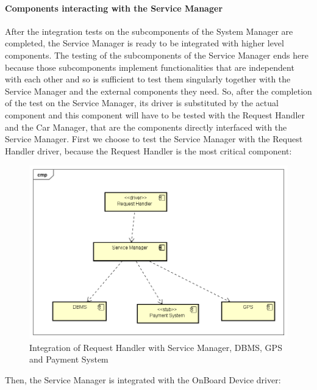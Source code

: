 \paragraph{Components interacting with the Service Manager}
After the integration tests on the subcomponents of the System Manager are completed, the Service Manager is ready to be integrated with higher level components. The testing of the subcomponents of the Service Manager ends here because those subcomponents implement functionalities that are independent with each other and so is sufficient to test them singularly together with the Service Manager and the external components they need.
\newline
So, after the completion of the test on the Service Manager, its driver is substituted by the actual component and this component will have to be tested with the Request Handler and the Car Manager, that are the components directly interfaced with the Service Manager.
First we choose to test the Service Manager with the Request Handler driver, because the Request Handler is the most critical component:


\begin{figure}[H]	
	\centering
	\includegraphics[width=\textwidth]{img/SrvMan_ReqHan_int}
	\caption{Integration of Request Handler with Service Manager, DBMS, GPS and Payment System}
\end{figure}

Then, the Service Manager is integrated with the OnBoard Device driver:


